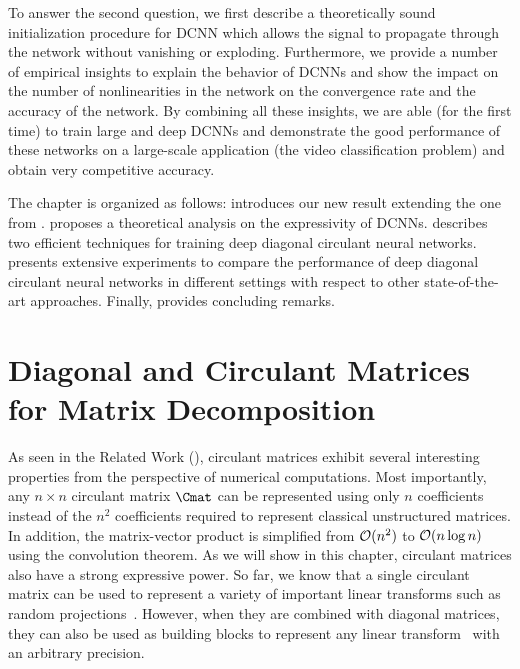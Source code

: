 To answer the second question, we first describe a theoretically sound initialization procedure for DCNN which allows the signal to propagate through the network without vanishing or exploding.
Furthermore, we provide a number of empirical insights to explain the behavior of DCNNs and show the impact on the number of nonlinearities in the network on the convergence rate and the accuracy of the network. 
By combining all these insights, we are able (for the first time) to train large and deep DCNNs and demonstrate the good performance of these networks on a large-scale application (the \yt video classification problem) and obtain very competitive accuracy. 

The chapter is organized as follows:
 introduces our new result extending the one from \citet{huhtanen2015factoring}.
 proposes a theoretical analysis on the expressivity of DCNNs.
 describes two efficient techniques for training deep diagonal circulant neural networks.
 presents extensive experiments to compare the performance of deep diagonal circulant neural networks in different settings with respect to other state-of-the-art approaches.
Finally,  provides concluding remarks.




\section{Diagonal and Circulant Matrices for Matrix Decomposition}
\label{section:ch4-diagonal_and_circulant_matrices_for_matrix_decomposition}

As seen in the Related Work (), circulant matrices exhibit several interesting properties from the perspective of numerical computations.
Most importantly, any $n \times n$ circulant matrix $\Cmat$ can be represented using only $n$ coefficients instead of the $n^2$ coefficients required to represent classical unstructured matrices.
In addition, the matrix-vector product is simplified from $\mathcal{O}(n^2)$ to $\mathcal{O}(n \log n)$ using the  convolution theorem.
As we will show in this chapter, circulant matrices also have a strong expressive power.
So far, we know that a single circulant matrix can be used to represent a variety of important linear transforms such as random projections~\cite{hinrichs2011johnson}. 
However, when they are combined with diagonal matrices, they can also be used as building blocks to represent any linear transform~\cite{schmid2000decomposing,huhtanen2015factoring} with an arbitrary precision.

